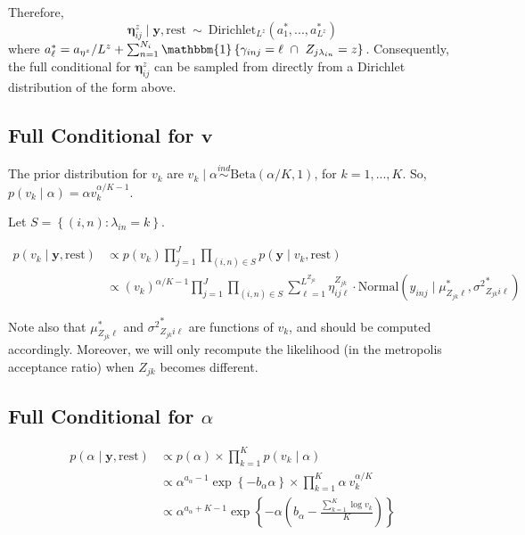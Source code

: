 \documentclass[12pt,]{article}
\newcommand{\p}[1]{\left(#1\right)}
\newcommand{\bc}[1]{ \left\{#1\right\} }
\newcommand{\N}{ \mathcal{N} }
\newcommand{\ind}{\overset{ind}{\sim}}
\def\N{\text{Normal}}
\def\Dir{\text{Dirichlet}}
\def\Be{\text{Beta}}
\def\lin{\lambda_{in}}
\def\y{\bm{y}}
\def\mus{\mu^*}
\def\sss{{\sigma^2}^*}
\newcommand{\Ind}[1]{\mathbbm{1}\bc{#1}}
\def\rest{\text{rest}}
\begin{document}
Therefore, \[
\bm{\eta}^z_{ij} \mid \y,\rest ~\sim~ \Dir_{L^z}\p{a^*_1,...,a^*_{L^z}}
\] where
\(a^*_\ell = a_{\eta^z}/L^z+\sum_{n=1}^{N_i}\Ind{\gamma_{inj}=\ell ~\cap~ Z_{j\lin}=z}\).
Consequently, the full conditional for \(\bm{\eta}^z_{ij}\) can be
sampled from directly from a Dirichlet distribution of the form above.

\subsection{\texorpdfstring{Full Conditional for
\(\bm v\)}{Full Conditional for \textbackslash{}bm v}}\label{full-conditional-for-bm-v}

The prior distribution for \(v_k\) are
\(v_k \mid \alpha \ind \Be(\alpha/K, 1)\), for \(k = 1,...,K\). So,
\(p(v_k \mid \alpha) = \alpha v_k^{\alpha/K-1}\).

Let \(S = \bc{(i,n)\colon \lin = k}\).

\begin{align*}
p(v_k \mid \y, \rest) &\propto p(v_k) \prod_{j=1}^J\prod_{(i,n)\in S} p(\y \mid v_k, \rest) \\
&\propto (v_k)^{\alpha/K-1} \prod_{j=1}^J \prod_{(i,n)\in S}
\sum_{\ell=1}^{L^{Z_{jk}}} \eta^{Z_{jk}}_{ij\ell} \cdot
\N(y_{inj} \mid \mus_{Z_{jk}\ell}, \sss_{Z_{jk}i\ell})
\end{align*}


Note also that \(\mus_{Z_{jk}\ell}\) and \(\sss_{Z_{jk}i\ell}\) are
functions of \(v_k\), and should be computed accordingly. Moreover, we
will only recompute the likelihood (in the metropolis acceptance ratio)
when \(Z_{jk}\) becomes different.

\subsection{\texorpdfstring{Full Conditional for
\(\alpha\)}{Full Conditional for \textbackslash{}alpha}}\label{full-conditional-for-alpha}

\begin{align*}
p(\alpha \mid \y, \rest) &\propto p(\alpha) \times \prod_{k=1}^K p(v_k \mid \alpha) \\
&\propto \alpha^{a_\alpha - 1} \exp\bc{-b_\alpha \alpha} \times \prod_{k=1}^K 
\alpha~v_k^{\alpha/K} \\
&\propto \alpha^{a_\alpha + K -1} \exp\bc{-\alpha\p{b_\alpha - 
\frac{\sum_{k=1}^K \log v_k}{K}}}
\end{align*}
\end{document}
